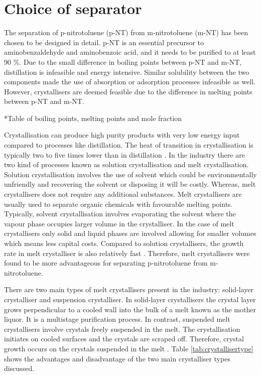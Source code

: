 \section{Choice of separator}
The separation of p-nitrotoluene (p-NT) from m-nitrotoluene (m-NT) has been chosen to be designed in detail. p-NT is an essential precursor to aminobenzaldehyde and aminobenzoic acid, and it needs to be purified to at least 90 \%. Due to the small difference in boiling points between p-NT and m-NT, distillation is infeasible and energy intensive. Similar solubility between the two components made the use of absorption or adsorption processes infeasible as well. However, crystallisers are deemed feasible due to the difference in melting points between p-NT and m-NT.

*Table of boiling points, melting points and mole fraction 

Crystallisation can produce high purity products with very low energy input compared to processes like distillation. The heat of transition in crystallisation is typically two to five times lower than in distillation \cite{noauthor_melt_nodate}. In the industry there are two kind of processes known as solution crystallisation and melt crystallisation. Solution crystallisation involves the use of solvent which could be environmentally unfriendly and recovering the solvent or disposing it will be costly. Whereas, melt crystallisers does not require any additional substances. Melt crystallisers are usually used to separate organic chemicals with favourable melting points. Typically, solvent crystallisation involves evaporating the solvent where the vapour phase occupies larger volume in the crystalliser. In the case of melt crystallisers only solid and liquid phases are involved allowing for smaller volumes which means less capital costs. Compared to solution crystallisers, the growth rate in melt crystalliser is also relatively fast \cite{myerson_handbook_2019}. Therefore, melt crystallisers were found to be more advantageous for separating p-nitrotoluene from m-nitrotoluene. 

There are two main types of melt crystallisers present in the industry: solid-layer crystalliser and suspension crystalliser. In solid-layer crystallisers the crystal layer grows perpendicular to a cooled wall into the bulk of a melt known as the mother liquor. It is a multistage purification process. In contrast, suspended melt crystallisers involve crystals freely suspended in the melt. The crystallisation initiates on cooled surfaces and the crystals are scraped off. Therefore, crystal growth occurs on the crystals suspended in the melt \cite{myerson_handbook_2019}. Table \ref{tab:crystallisertype} shows the advantages and disadvantage of the two main crystalliser types discussed. 

